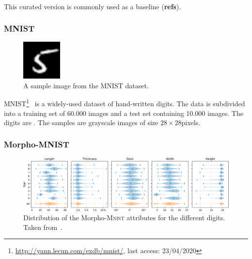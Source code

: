 This curated version is commonly used as a baseline (\textbf{refs}).

\subsubsection{MNIST}\label{subsubsec:mnist}

\begin{figure}
    \begin{center}
        \includegraphics[width=0.18\textwidth]{images/mnist_sample.png}
    \end{center}
    \caption[MNIST dataset sample image]{A sample image from the MNIST dataset.}
    \label{fig:mnist_sample}
\end{figure}

MNIST\footnote{\href{http://yann.lecun.com/exdb/mnist/}{http://yann.lecun.com/exdb/mnist/}, last access: 23/04/2020}~\citep{lecun1998gradient} is a widely-used dataset of hand-written digits.
The data is subdivided into a training set of 60.000 images and a test set containing 10.000 images.
The digits are .
The samples are grayscale images of size $28\times 28$pixels.

\subsubsection{Morpho-MNIST}\label{subsubsec:morphomnist}

\begin{figure}
    \centering
    \includegraphics[width=\textwidth]{images/morpho_mnist_distribution.png}
    \caption[Morpho-\textsc{Mnist} distribution]{Distribution of the Morpho-\textsc{Mnist} attributes for the different digits. Taken from~\citep{castro2019morpho}.}
    \label{fig:morpho_mnist_distribution}
\end{figure}

